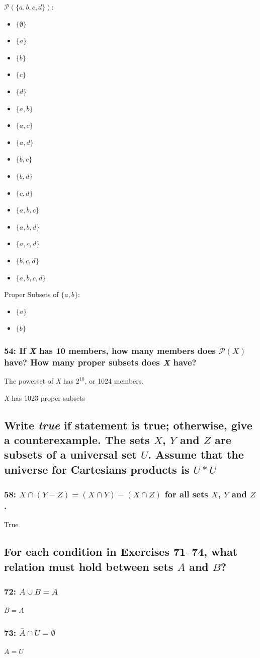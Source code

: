 \documentclass[12pt,titlepage]{article}
\begin{document}
$\mathcal{P}(\{a, b, c, d\})$:
\begin{multicols}{2}
\begin{itemize}
	\item $\{\emptyset\}$
	\item $\{a\}$
	\item $\{b\}$
	\item $\{c\}$
	\item $\{d\}$
	\item $\{a, b\}$
	\item $\{a, c\}$
	\item $\{a, d\}$
	\item $\{b, c\}$
	\item $\{b, d\}$
	\item $\{c, d\}$
	\item $\{a, b, c\}$
	\item $\{a, b, d\}$
	\item $\{a, c, d\}$
	\item $\{b, c, d\}$
	\item $\{a, b, c, d\}$
\end{itemize}
\end{multicols}

Proper Subsets of $\{a, b\}$:
\begin{itemize}
	\item $\{a\}$
	\item $\{b\}$
\end{itemize}

\subsubsection*{54: If \textit{X} has 10 members, how many members does $\mathcal{P}(X)$ have? How many 
proper subsets does \textit{X} have?}

The powerset of \textit{X} has $2^{10}$, or 1024 members.

\textit{X} has 1023 proper subsets
\subsection*{Write \textit{true} if statement is true; otherwise, give a counterexample. The sets $X$, $Y$ and $Z$
are subsets of a universal set $U$. Assume that the universe for Cartesians products is $U * U$}

\subsubsection*{58: $X \cap (Y - Z) = (X \cap Y) - (X \cap Z)$ for all sets $X$, $Y$ and $Z$.}

True
\subsection*{For each condition in Exercises 71--74, what relation must hold between sets $A$ and $B$?}
\subsubsection*{72: $A \cup B = A$}

$B = A$
\subsubsection*{73: $\overline{A} \cap U = \emptyset$}

$A = U$
\end{document}
